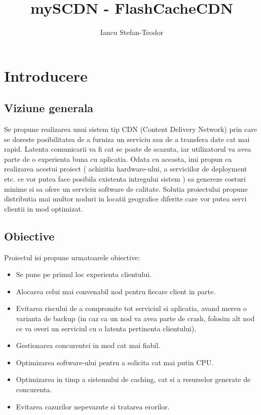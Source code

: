 \documentclass[runningheads]{llncs}
\begin{document}
\title{mySCDN - FlashCacheCDN}
\author{Iancu Stefan-Teodor}
\maketitle

\section{Introducere}
\subsection{Viziune generala}
Se propune realizarea unui sistem tip CDN (Content Delivery Network) prin care se doreste posibilitatea de a furniza un serviciu sau de a transfera date cat mai rapid. Latenta comunicarii va fi cat se poate de scazuta, iar utilizatorul va avea parte de o experienta buna cu aplicatia. Odata cu aceasta, imi propun ca realizarea acestui proiect ( achizitia hardware-ului, a serviciilor de deployment etc. ce vor putea face posibila existenta intregului sistem ) sa genereze costuri minime si sa ofere un serviciu software de calitate. Solutia proiectului propune distributia mai multor noduri in locatii geografice diferite  care vor putea servi clientii in mod optimizat.

\subsection{Obiective}
Proiectul isi propune urmatoarele obiective:
\begin{itemize}
    \item Se pune pe primul loc experienta clientului.
    \item Alocarea celui mai convenabil nod pentru fiecare client in parte.
    \item Evitarea riscului de a compromite tot serviciul si aplicatia, avand mereu o varianta de backup (in caz ca un nod va avea parte de crash, folosim alt nod ce va overi un serviciul cu o latenta pertinenta clientului).
    \item Gestionarea concurentei in mod cat mai fiabil.
    \item Optimizarea software-ului pentru a solicita cat mai putin CPU.
    \item Optimizarea in timp a sistemului de caching, cat si a resurselor generate de concurenta.
    \item Evitarea cazurilor nepevazute si tratarea erorilor.
\end{itemize}
\end{document}
